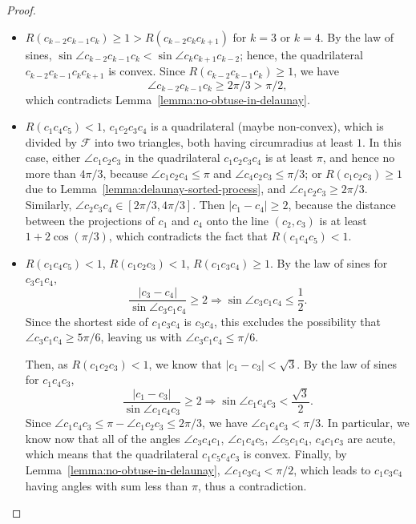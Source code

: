 \begin{appendices}
\begin{proof}
\begin{itemize}
    \item $R(c_{k-2}c_{k-1}c_k)\geq 1 > R(c_{k-2}c_kc_{k+1})$ for $k = 3$ or $k = 4$. By the law of sines, $\sin \angle c_{k-2}c_{k-1}c_k < \sin \angle c_kc_{k+1}c_{k-2}$; hence, the quadrilateral $c_{k-2}c_{k-1}c_kc_{k+1}$ is convex.
    Since $R(c_{k-2}c_{k-1}c_k)\geq 1$, we have $$\angle c_{k-2}c_{k-1}c_k\geq 2\pi/3 > \pi/2,$$ which contradicts Lemma~\ref{lemma:no-obtuse-in-delaunay}.
    
    \item $R(c_1c_4c_5) < 1$, $c_1c_2c_3c_4$ is a quadrilateral (maybe non-convex), which is divided by $\mathcal{F}$ into two triangles, both having circumradius at least $1$.
    In this case, either $\angle c_1c_2c_3$ in the quadrilateral $c_1c_2c_3c_4$ is at least $\pi$, and hence no more than $4\pi/3$, because $\angle c_1c_2c_4\leq\pi$ and $\angle c_4c_2c_3\leq\pi/3$; or $R(c_1c_2c_3)\geq 1$ due to Lemma~\ref{lemma:delaunay-sorted-process}, and $\angle c_1c_2c_3\geq 2\pi/3$. Similarly, $\angle c_2c_3c_4\in[2\pi/3, 4\pi/3]$.
    Then $|c_1 - c_4|\geq 2$, because the distance between the projections of $c_1$ and $c_4$ onto the line $(c_2, c_3)$ is at least $1 + 2\cos(\pi/3)$, which contradicts the fact that $R(c_1c_4c_5) < 1$.
    
    \item $R(c_1c_4c_5) < 1$, $R(c_1c_2c_3) < 1$, $R(c_1c_3c_4)\geq 1$. By the law of sines for $c_3c_1c_4$,
    $$\frac{|c_3 - c_4|}{\sin\angle c_3c_1c_4} \geq 2 \Rightarrow \sin\angle c_3c_1c_4\leq\frac12.$$
    Since the shortest side of $c_1c_3c_4$ is $c_3c_4$, this excludes the possibility that $\angle c_3c_1c_4\geq5\pi/6$, leaving us with $\angle c_3c_1c_4\leq\pi/6$.
    
    Then, as $R(c_1c_2c_3) < 1$, we know that $|c_1 - c_3| < \sqrt{3}$. By the law of sines for $c_1c_4c_3$,
    $$\frac{|c_1 - c_3|}{\sin\angle c_1c_4c_3} \geq 2 \Rightarrow \sin\angle c_1c_4c_3 < \frac{\sqrt 3}{2}.$$ Since $\angle c_1c_4c_3\leq \pi - \angle c_1c_2c_3\leq2\pi/3$, we have $\angle c_1c_4c_3 < \pi/3$. In particular, we know now that all of the angles $\angle c_3c_4c_1$, $\angle c_1c_4c_5$, $\angle c_5c_1c_4$, $c_4c_1c_3$ are acute, which means that the quadrilateral $c_1c_5c_4c_3$ is convex. Finally, by Lemma~\ref{lemma:no-obtuse-in-delaunay}, $\angle c_1c_3c_4 < \pi/2$, which leads to $c_1c_3c_4$ having angles with sum less than $\pi$, thus a contradiction.
    

\end{itemize}
\end{proof}
\end{appendices}
